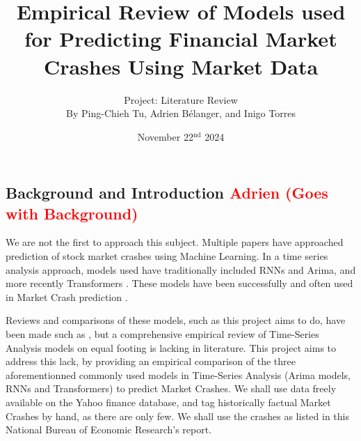\documentclass[12pt, letterpaper]{article}
\title{Empirical Review of Models used for Predicting Financial Market Crashes Using Market Data}
\author{\large Project: Literature Review \vspace{0.75em} \\ \normalsize By Ping-Chieh Tu, Adrien Bélanger, and Inigo Torres}
\date{November 22$^{\text{nd}}$ 2024}
\begin{document}
\maketitle 

\justifying %
\begin{comment}
Overall objective to keep in mind:

"In this milestone, the objective is to review the related literature to your proposal. This will better inform your methodology for your project if it involves a new idea, and it is necessary if you are comparing existing methods for a certain domain. It may even lead to a change of proposal, once you learn about existing methods out there. If you are producing a literature survey on a research topic, in this stage, you just provide a "breadth" review, in which you emphasize covering as many related works as possible and providing some preliminary organization without going into much detail."\\

Evaluation Criterias:

- Putting your proposal into context of related literature

- Coverage (are you adequately covering most relevant works)
\end{comment}
\subsection*{Background and Introduction \textcolor{red}{Adrien (Goes with Background)} }
We are not the first to approach this subject. 
Multiple papers have approached prediction of stock market crashes using Machine Learning. 
In a time series analysis approach, models used have traditionally included RNNs and Arima, and more recently Transformers \cite{Ahmed} \cite{ArunKumar}. 
These models have been successfully and often used in Market Crash prediction \cite{Okpeke}. 


Reviews and comparisons of these models, such as this project aims to do, have been made such as \cite{Okpeke}, but a comprehensive empirical review of Time-Series Analysis models on equal footing is lacking in literature. 
This project aims to address this lack, by providing an empirical comparison of the three aforementionned commonly used models in Time-Series Analysis (Arima models, RNNs and Transformers) to predict Market Crashes. \cite{Ahmed} \cite{ArunKumar}
We shall use data freely available on the Yahoo finance database, and tag historically factual Market Crashes by hand, as there are only few. We shall use the crashes as listed in this National Bureau of Economic Research's report. \cite{Mishkin}
\end{document}
